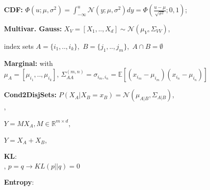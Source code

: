 \vspace*{-0.5mm}
\textbf{CDF:} \; \mbox{\fontsize{9}{6}\selectfont $\Phi(u;\mu,\sigma^2) = \int_{-\infty}^{u}\mathcal{N}(y;\mu,\sigma^2)dy=\Phi(\frac{u-\mu}{\sqrt{\sigma^2}};0,1)$;}

\vspace*{-0.5mm}
\textbf{Multivar. Gauss:} \;
\mbox{\fontsize{8}{6}\selectfont $X_V = [X_1, .., X_d] \sim \mathcal{N}(\mu_V, \Sigma_{VV})$},

index sets \mbox{\fontsize{8}{6}\selectfont $A = \{i_1,..,i_k\}$, $B = \{j_1,..,j_m\}$, $A \cap B = \emptyset$}

\textbf{Marginal:} \;  with \\
\mbox{\fontsize{8.8}{6}\selectfont $\mu_A = [\mu_{i_1},..,\mu_{i_k}]$},
\mbox{$\Sigma_{AA}^{(m,n)} = \sigma_{i_m,i_n} = \mathbb{E}[(x_{i_m} - \mu_{i_m}) (x_{i_n} - \mu_{i_n})]$}

\textbf{Cond2DisjSets:} \; $P(X_A | X_B = x_B) = \mathcal{N}(\mu_{A|B}, \Sigma_{A|B})$, \\ 
, \\ 

$Y = M X_A, M \in \mathbb{R}^{m \times d}$, \hfill {} \;

$Y = X_A + X_B$, \hfill {} \;




\textbf{KL}: \;
 \\
\vspace*{-0.5mm}
, \; $p=q \rightarrow KL(p||q) = 0$

\textbf{Entropy}: \; 

